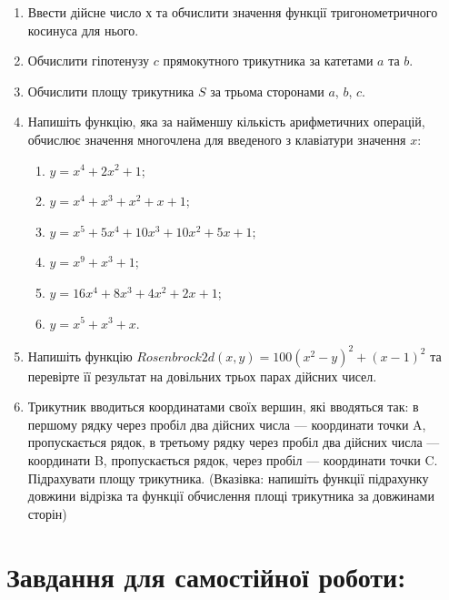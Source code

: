 \documentclass[a5paper,titlepage,openany,twoside,draft]{book_unv}%
\makeatletter
\newcommand{\xslalph}[1]{\expandafter\@xslalph\csname c@#1\endcsname}
\newcommand{\@xslalph}[1]{%
    \ifcase#1\or а\or б\or в\or г\or д\or e\or є\or ж\or з\or i%
    \or й\or к\or л\or м\or н\or о\or п\or р\or с\or т%
    \or у\or ф\or х\or ц\or ч\or ш\or ю\or я\or аа\or бб\or вв%
    \else\@ctrerr\fi%
}
\makeatother
\begin{document}
\begin{enumerate}
\def\labelenumi{\arabic{enumi})}
\item
  Ввести дійсне число х та обчислити значення функції тригонометричного
  косинуса для нього.
\item
  Обчислити гіпотенузу $c$ прямокутного трикутника за катетами
  $a$ та $b$.
\item
  Обчислити площу трикутника $S$ за трьома сторонами $a$,
  $b$, $c$.

\item
  Напишіть функцію, яка за найменшу кількість арифметичних операцій,
  обчислює значення многочлена для введеного з клавіатури значення
  $x$:
  \begin{enumerate}[label=\xslalph*)]
  \item \(y = x^{4} + 2x^{2} + 1\); 
  \item \(y = x^{4} + x^{3} + x^{2} + x + 1\);
  \item \(y = x^{5} + 5x^{4} + 10x^{3} + 10x^{2} + 5x + 1\);
  \item \(y = x^{9} + x^{3} + 1\);
  \item \(y = 16x^{4} + 8x^{3} + 4x^{2} + 2x + 1\); 
  \item \(y = x^{5} + x^{3} + x\).
  \end{enumerate}

\item
  Напишіть функцію $ Rosenbrock2d(x,y) = 100(x^{2} - y)^{2} + (x - 1)^{2}$ 
 та перевірте її результат на довільних трьох парах дійсних чисел.

\item
  Трикутник вводиться координатами своїх вершин, які вводяться так: в
  першому рядку через пробіл два дійсних числа --- координати точки A,
  пропускається рядок, в третьому рядку через пробіл два дійсних числа
  --- координати B, пропускається рядок, через пробіл --- координати
  точки C. Підрахувати площу трикутника. (Вказівка: напишіть функції
  підрахунку довжини відрізка та функції обчислення площі трикутника за
  довжинами сторін)
\end{enumerate}

\section{Завдання для самостійної роботи:}
\end{document}
